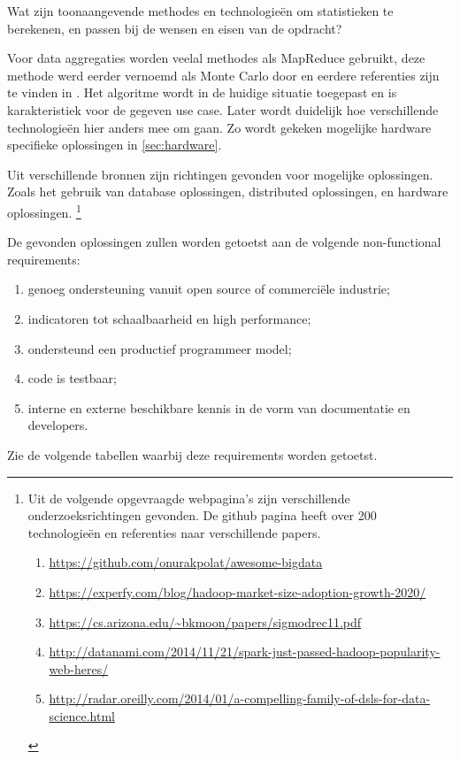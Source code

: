 Wat zijn toonaangevende methodes en technologieën om statistieken te berekenen, en passen bij de wensen en eisen van de opdracht?

Voor data aggregaties worden veelal methodes als MapReduce gebruikt, deze methode werd eerder vernoemd als Monte Carlo door \textcite{asanovic2006landscape} en eerdere referenties zijn te vinden in \textcite{lee2010debunking}. Het algoritme wordt in de huidige situatie toegepast en is karakteristiek voor de gegeven use case. Later wordt duidelijk hoe verschillende technologieën hier anders mee om gaan. Zo wordt gekeken mogelijke hardware specifieke oplossingen in \ref{sec:hardware}.


Uit verschillende bronnen zijn richtingen gevonden voor mogelijke oplossingen. Zoals het gebruik van database oplossingen, distributed oplossingen, en hardware oplossingen. \footnote{
Uit de volgende opgevraagde webpagina's zijn verschillende onderzoeksrichtingen gevonden. De github pagina heeft over 200 technologieën en referenties naar verschillende papers.
\begin{enumerate}
    \item \url{https://github.com/onurakpolat/awesome-bigdata}
    \item \url{https://experfy.com/blog/hadoop-market-size-adoption-growth-2020/}
    \item \url{https://cs.arizona.edu/~bkmoon/papers/sigmodrec11.pdf}
    \item \url{http://datanami.com/2014/11/21/spark-just-passed-hadoop-popularity-web-heres/}
    \item \url{http://radar.oreilly.com/2014/01/a-compelling-family-of-dsls-for-data-science.html}
\end{enumerate}
}


De gevonden oplossingen zullen worden getoetst aan de volgende non-functional requirements:
\begin{enumerate}[label=(\alph*)]
   \item genoeg ondersteuning vanuit open source of commerciële industrie;
   \item indicatoren tot schaalbaarheid en high performance;
   \item ondersteund een productief programmeer model;
   \item code is testbaar;
   \item interne en externe beschikbare kennis in de vorm van documentatie en developers.
\end{enumerate}

Zie de volgende tabellen waarbij deze requirements worden getoetst.


\begin{comment}
Er zijn een aantal oplossingen gevonden die maximaal gebruik kunnen maken van de performance die moderne hardware te bieden heeft
- clustered databases analytics / datawarehouses (RDBMS): google bigquery, vertica, redshift, hadoopDb, Teradata
- map reduce platform: spark, hadoop, disco etc.
- Hardware, software solutions: Forge en Golang Python, MATLAB, R, Golang, Rust
\end{comment}